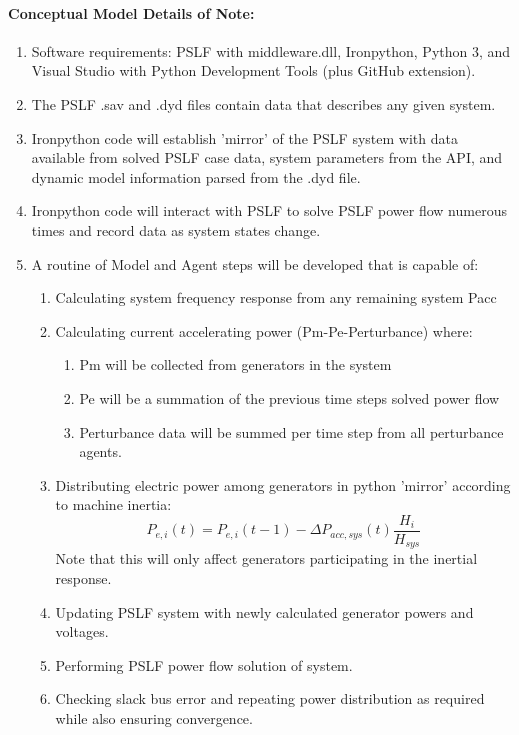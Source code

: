 \documentclass[12pt]{article}
\begin{document}
\paragraph{Conceptual Model Details of Note:}
\begin{enumerate}
\item Software requirements: PSLF with middleware.dll, Ironpython, Python 3, and Visual Studio with Python Development Tools (plus GitHub extension).

\item The PSLF .sav and .dyd files contain data that describes any given system.

\item Ironpython code will establish 'mirror' of the PSLF system with data available from solved PSLF case data, system parameters from the API, and dynamic model information parsed from the .dyd file.

\item Ironpython code will interact with PSLF to solve PSLF power flow numerous times and record data as system states change.

\item A routine of Model and Agent steps will be developed that is capable of:
	\begin{enumerate}
		\item Calculating system frequency response from any remaining system Pacc
		\item Calculating current accelerating power  (Pm-Pe-Perturbance) where:
		\begin{enumerate}
			\item Pm will be collected from generators in the system
			\item Pe will be a summation of the previous time steps solved power flow
			\item Perturbance data will be summed per time step from all perturbance agents.
		\end{enumerate}
		\item Distributing electric power among generators in python 'mirror' according to machine inertia:
		\[ P_{e,i}(t) = P_{e,i}(t-1)-\Delta P_{acc,sys}(t)\dfrac{H_{i}}{H_{sys}} \]
		Note that this will only affect generators participating in the inertial response.
		\item Updating PSLF system with newly calculated generator powers and voltages.
		\item Performing PSLF power flow solution of system.
		\item Checking slack bus error and repeating power distribution as required while also ensuring convergence.
		

\end{enumerate}
\end{enumerate}
\end{document}
